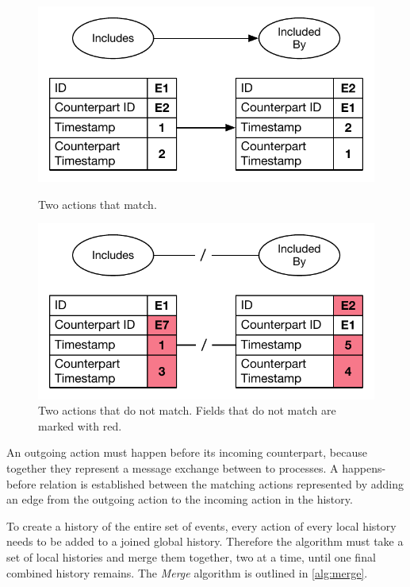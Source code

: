     \begin{figure}[H]
		\centering
		\begin{minipage}{0.45\textwidth}
			\centering
			\includegraphics[width=\textwidth]{4connect/images/actions-match.pdf}
			\caption{Two actions that match.}
			\label{fig:connect:actions-match}
		\end{minipage}\hfill
		\begin{minipage}{0.45\textwidth}
			\centering
			\includegraphics[width=\textwidth]{4connect/images/actions-do-not-match.pdf}
            \caption{Two actions that do not match. Fields that do not match are marked with red.}
            \label{fig:connect:actions-do-not-match}
		\end{minipage}
    \end{figure}
        
    \noindent An outgoing action must happen before its incoming counterpart, because together they represent a message exchange between to processes. A happens-before relation is established between the matching actions represented by adding an edge from the outgoing action to the incoming action in the history.

	\newpar To create a history of the entire set of events, every action of every local history needs to be added to a joined global history. Therefore the algorithm must take a set of local histories and merge them together, two at a time, until one final combined history remains. The \textit{Merge} algorithm is outlined in \autoref{alg:merge}.
	
